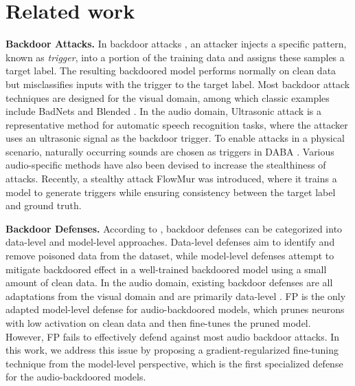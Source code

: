 \section{Related work}
\noindent \textbf{Backdoor Attacks. }In backdoor attacks \cite{gu2019badnets}, an attacker injects a specific pattern, known as \textit{trigger}, into a portion of the training data and assigns these samples a target label. The resulting backdoored model performs normally on clean data but misclassifies inputs with the trigger to the target label. Most backdoor attack techniques \cite{gu2019badnets, chen2017targeted, nguyen2020input, nguyen2021wanet, wang2022bppattack, wu2023attacks} are designed for the visual domain, among which classic examples include BadNets \cite{gu2019badnets} and Blended \cite{chen2017targeted}. In the audio domain, Ultrasonic attack \cite{koffas2022can} is a representative method for automatic speech recognition tasks, where the attacker uses an ultrasonic signal as the backdoor trigger. To enable attacks in a physical scenario, naturally occurring sounds are chosen as triggers in DABA \cite{liu2022opportunistic}. Various audio-specific methods \cite{koffas2023going, cai2024towards} have also been devised to increase the stealthiness of attacks. Recently, a stealthy attack FlowMur \cite{lan2024flowmur} was introduced, where it trains a model to generate triggers while ensuring consistency between the target label and ground truth.

\noindent \textbf{Backdoor Defenses. }According to \cite{yan2023backdoor}, backdoor defenses can be categorized into data-level and model-level approaches. Data-level defenses aim to identify and remove poisoned data from the dataset, while model-level defenses attempt to mitigate backdoored effect in a well-trained backdoored model using a small amount of clean data. In the audio domain, existing backdoor defenses are all adaptations from the visual domain and are primarily data-level \cite{gao2019strip, ma2022beatrix}. FP \cite{liu2018fine} is the only adapted model-level defense for audio-backdoored models, which prunes neurons with low activation on clean data and then fine-tunes the pruned model. However, FP fails to effectively defend against most audio backdoor attacks. In this work, we address this issue by proposing a gradient-regularized fine-tuning technique from the model-level perspective, which is the first specialized defense for the audio-backdoored models. 


